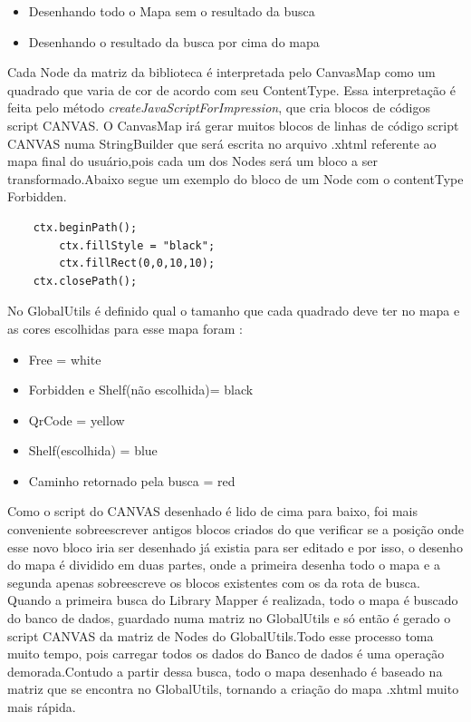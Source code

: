 \documentclass[a4paper,10pt]{article}
\begin{document}
\begin{itemize}	
	\item{ Desenhando todo o Mapa sem o resultado da busca}

	\item{ Desenhando o resultado da busca por cima do mapa}\\	
\end{itemize}
	Cada Node da matriz da biblioteca é interpretada pelo CanvasMap como um quadrado que varia de cor de acordo com seu ContentType.
	Essa interpretação é feita pelo método {\it createJavaScriptForImpression}, que cria blocos de códigos script CANVAS.
	O CanvasMap irá gerar muitos blocos de linhas de código script CANVAS numa StringBuilder que será escrita no arquivo .xhtml referente 
	ao mapa final do usuário,pois cada um dos Nodes será um bloco a ser transformado.Abaixo segue um exemplo do bloco de um Node com o 
	contentType Forbidden.\\
      \begin{lstlisting}	
	ctx.beginPath();
		ctx.fillStyle = "black";
		ctx.fillRect(0,0,10,10);
	ctx.closePath();
      \end{lstlisting}					

	No GlobalUtils é definido qual o tamanho que cada quadrado deve ter no mapa e as cores escolhidas para esse mapa foram :

\begin{itemize}	
	\item{ Free = white}
	\item{ Forbidden e Shelf(não escolhida)= black}
	\item{ QrCode = yellow }
	\item{ Shelf(escolhida) = blue}
	\item{ Caminho retornado pela busca = red}
\end{itemize}
	Como o script do CANVAS desenhado é lido de cima para baixo, foi mais conveniente sobreescrever antigos blocos criados do que
	verificar se a posição onde esse novo bloco iria ser desenhado já existia para ser editado e por isso, o desenho do mapa é dividido em duas partes, onde a
	primeira desenha todo o mapa e a segunda apenas sobreescreve os blocos existentes com os da rota de busca.\\	  
	
	Quando a primeira busca do Library Mapper é realizada, todo o mapa é buscado do banco de dados, guardado numa matriz no GlobalUtils e 
	só então é gerado o script CANVAS da matriz de Nodes do GlobalUtils.Todo esse processo toma muito tempo, pois carregar todos os dados do
	Banco de dados é uma operação demorada.Contudo a partir dessa busca, todo o mapa desenhado é baseado na matriz que se encontra
	no GlobalUtils, tornando a criação do mapa .xhtml muito mais rápida. 
\end{document}
